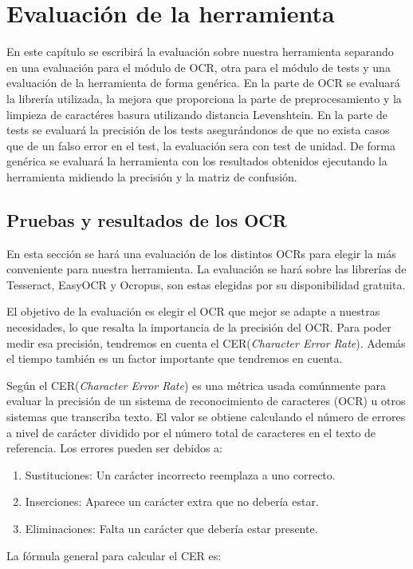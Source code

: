 \chapter{Evaluación de la herramienta}
\label{cap:evaluacion}

En este capítulo se escribirá la evaluación sobre nuestra herramienta separando en una evaluación para el módulo de OCR, otra para el módulo de tests y una evaluación de la herramienta de forma genérica.
En la parte de OCR se evaluará la librería utilizada, la mejora que proporciona la parte de preprocesamiento y la limpieza de caractéres basura utilizando distancia Levenshtein.
En la parte de tests se evaluará la precisión de los tests asegurándonos de que no exista casos que de un falso error en el test, la evaluación sera con test de unidad.
De forma genérica se evaluará la herramienta con los resultados obtenidos ejecutando la herramienta midiendo la precisión y la matriz de confusión.

\section{Pruebas y resultados de los OCR}
\label{sec:Evaluación_OCR}
En esta sección se hará una evaluación de los distintos OCRs para elegir la más conveniente para nuestra herramienta.
La evaluación se hará sobre las librerías de Tesseract, EasyOCR y Ocropus, son estas elegidas por su disponibilidad gratuita.

El objetivo de la evaluación es elegir el OCR que mejor se adapte a nuestras necesidades, lo que resalta la importancia de la precisión del OCR.
Para poder medir esa precisión, tendremos en cuenta el CER(\textit{Character Error Rate}). Además el tiempo también es un factor importante que tendremos en cuenta.

Según \cite{CER} el CER(\textit{Character Error Rate}) es una métrica usada comúnmente para evaluar la precisión de un sistema de reconocimiento de caracteres (OCR) u otros sistemas que transcriba texto. El valor se obtiene calculando el número de errores a nivel de carácter dividido por el número total de caracteres en el texto de referencia.
Los errores pueden ser debidos a:
\begin{enumerate}
	\item Sustituciones: Un carácter incorrecto reemplaza a uno correcto.
	\item Inserciones: Aparece un carácter extra que no debería estar.
	\item Eliminaciones: Falta un carácter que debería estar presente.
\end{enumerate}
La fórmula general para calcular el CER es:

